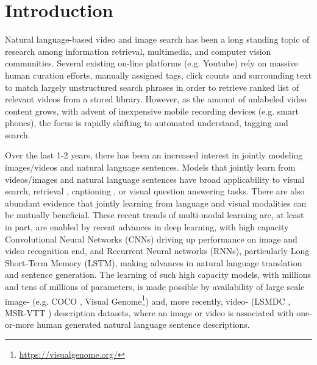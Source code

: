 \documentclass[runningheads]{llncs}
\begin{document}
\section{Introduction}
Natural language-based video and image search has been a long standing topic of research among information retrieval, multimedia, and computer vision communities. Several existing on-line platforms (e.g. Youtube) rely on massive human curation efforts, manually assigned tags, click counts and surrounding text to match largely unstructured search phrases in order to retrieve ranked list of relevant videos from a stored library. However, as the amount of unlabeled video content grows, with advent of inexpensive mobile recording devices (e.g. smart phones), the focus is rapidly shifting to automated understand, tagging and search.   

Over the last 1-2 years, there has been an increased interest in jointly modeling images/videos and natural language sentences. Models that jointly learn from videos/images and natural language sentences have broad applicability to visual search, retrieval \cite{kiros15tacl,IvanVendrov2015}, captioning \cite{donahue15cvpr,XuBKCCSZB15,vinyals15cvpr}, or visual question answering \cite{VQA,gao2015mQA,948} tasks. There are also abundant evidence \cite{Sadeghi2015,Wu2016} that jointly learning from language and visual modalities can be mutually beneficial. These recent trends of multi-modal learning are, at least in part, are enabled by recent advances in deep learning, with high capacity Convolutional Neural Networks (CNNs) driving up performance on image and video recognition \cite{SimonyanZ14,Simonyan14c,WuWJYX15} end, and Recurrent Neural networks (RNNs), particularly Long Short-Term Memory (LSTM), making advances in natural language translation and sentence generation. The learning of such high capacity models, with millions and tens of millions of parameters, is made possible by availability of large scale image- (e.g. COCO \cite{502}, Visual Genome\footnote{\url{https://visualgenome.org/}}) and, more recently, video- (LSMDC \cite{LSMDC15}, MSR-VTT \cite{264836}) description datasets, where an image or video is associated with one-or-more human generated natural language sentence descriptions. 
\end{document}
